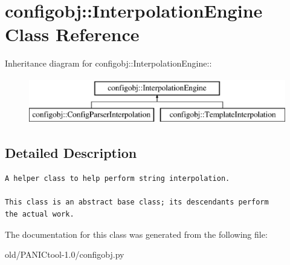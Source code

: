 \section{configobj::Interpolation\-Engine Class Reference}
\label{classconfigobj_1_1InterpolationEngine}
Inheritance diagram for configobj::Interpolation\-Engine::\begin{figure}[H]
\begin{center}
\leavevmode
\includegraphics[height=2cm]{classconfigobj_1_1InterpolationEngine}
\end{center}
\end{figure}


\subsection{Detailed Description}


\footnotesize\begin{verbatim}
A helper class to help perform string interpolation.

This class is an abstract base class; its descendants perform
the actual work.
\end{verbatim}
\normalsize
 



The documentation for this class was generated from the following file:\begin{CompactItemize}
\item 
old/PANICtool-1.0/configobj.py\end{CompactItemize}
